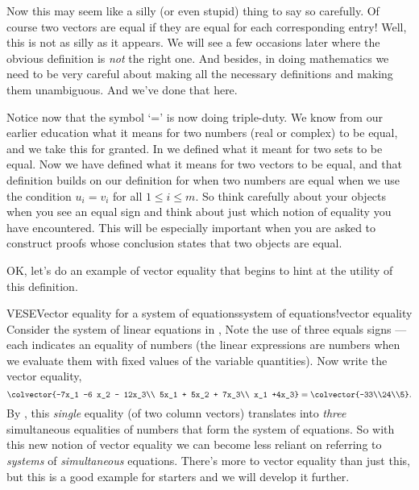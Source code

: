 %
Now this may seem like a silly (or even stupid) thing to say so carefully.  Of course two vectors are equal if they are equal for each corresponding entry!  Well, this is not as silly as it appears.  We will see a few occasions later where the obvious definition is {\em not} the right one.  And besides, in doing mathematics we need to be very careful about making all the necessary definitions and making them unambiguous.  And we've done that here. \par
%
Notice now that the symbol `=' is now doing triple-duty.  We know from our earlier education what it means for two numbers (real or complex) to be equal, and we take this for granted.  In  we defined what it meant for two sets to be equal.  Now we have defined what it means for two vectors to be equal, and that definition builds on our definition for when two numbers are equal when we use the condition $u_i=v_i$ for all $1\leq i\leq m$.  So think carefully about your objects when you see an equal sign and think about just which notion of equality you have encountered.  This will be especially important when you are asked to construct proofs whose conclusion states that two objects are equal.\par
%
OK, let's do an example of vector equality that begins to hint at the utility of this definition.
%
\begin{example}{VESE}{Vector equality for a system of equations}{system of equations!vector equality}
Consider the system of linear equations in ,
%
%
Note the use of three equals signs --- each indicates an equality of numbers (the linear expressions are numbers when we evaluate them with fixed values of the variable quantities).  Now write the vector equality,
%
\begin{equation*}
\colvector{-7x_1 -6 x_2 - 12x_3\\ 5x_1  + 5x_2 + 7x_3\\ x_1 +4x_3}
=
\colvector{-33\\24\\5}.
\end{equation*}
%
By , this {\em single} equality (of two column vectors) translates into {\em three} simultaneous equalities of numbers that form the system of equations.  So with this new notion of vector equality we can become less reliant on referring to {\em systems} of {\em simultaneous} equations.  There's more to vector equality than just this, but this is a good example for starters and we will develop it further.
\end{example}
